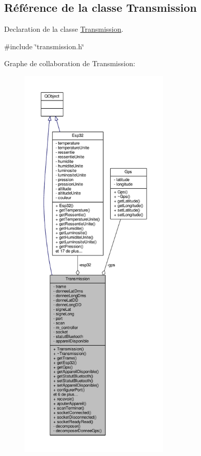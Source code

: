\hypertarget{class_transmission}{}\subsection{Référence de la classe Transmission}
\label{class_transmission}


Declaration de la classe \hyperlink{class_transmission}{Transmission}.  




{\ttfamily \#include \char`\"{}transmission.\+h\char`\"{}}



Graphe de collaboration de Transmission\+:
\nopagebreak
\begin{figure}[H]
\begin{center}
\leavevmode
\includegraphics[height=550pt]{class_transmission__coll__graph}
\end{center}
\end{figure}
